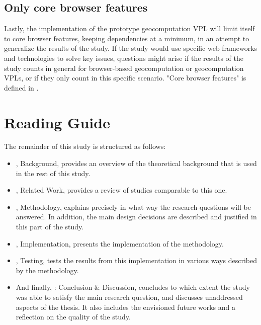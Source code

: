 \subsection*{Only core browser features}
Lastly, the implementation of the prototype geocomputation VPL will limit itself to core browser features, keeping dependencies at a minimum, in an attempt to generalize the results of the study.
If the study would use specific web frameworks and technologies to solve key issues, questions might arise if the results of the study counts in general for browser-based geocomputation or geocomputation VPLs, or if they only count in this specific scenario. 
"Core browser features" is defined in .

\newpage
\section{Reading Guide}
The remainder of this study is structured as follows:


\begin{itemize}[ ]
  \item {}, Background, provides an overview of the theoretical background that is used in the rest of this study.
  
  \item {}, Related Work, provides a review of studies comparable to this one.

  \item {}, Methodology, explains precisely in what way the research-questions will be answered.
  In addition, the main design decisions are described and justified in this part of the study.

  \item {}, Implementation, presents the implementation of the methodology.
  
  \item {}, Testing, tests the results from this implementation in various ways described by the methodology.
  
  \item And finally, : Conclusion \& Discussion, concludes to which extent the study was able to satisfy the main research question, and discusses unaddressed aspects of the thesis.
  It also includes the envisioned future works and a reflection on the quality of the study.

\end{itemize}